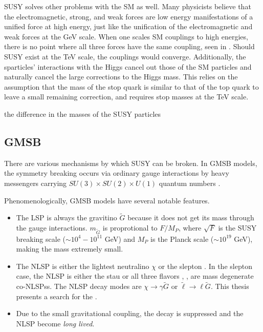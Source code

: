 \ac{SUSY} solves other problems with the \ac{SM} as well. Many physicists believe that the electromagnetic, strong, and weak forces are low energy manifestations of a unified force at high energy, just like the unification of the electromagnetic and weak forces at the GeV scale. When one scales \ac{SM} couplings to high energies, there is no point where all three forces have the same coupling, seen in . Should \ac{SUSY} exist at the TeV scale, the couplings would converge. Additionally, the sparticles' interactions with the Higgs cancel out those of the \ac{SM} particles and naturally cancel the large corrections to the Higgs mass. This relies on the assumption that the mass of the stop quark is similar to that of the top quark to leave a small remaining correction, and requires stop masses at the TeV scale.


the difference in the masses of the \ac{SUSY} particles 





\subsection{GMSB}
\label{sec:gmsb}

There are various mechanisms by which \ac{SUSY} can be broken. In \acf{GMSB} models, the symmetry breaking occurs via ordinary gauge interactions by heavy messengers carrying $SU(3) \times SU(2) \times U(1)$ quantum numbers \cite{gmsb-lep,Dimopoulos_1996,Ambrosanio_1997}. 



Phenomenologically, \ac{GMSB} models have several notable features. 
\begin{itemize}
	\item The \ac{LSP} is always the gravitino $\tilde{G}$ because it does not get its mass through the gauge interactions. $m_{\tilde{G}}$ is proprotional to $F/M_P$, where $\sqrt{F}$ is the \ac{SUSY} breaking scale ($\sim 10^4 - 10^{11}$ GeV) and $M_P$ is the Planck scale ($\sim 10^{19}$ GeV), making the mass extremely small.

	\item The \ac{NLSP} is either the lightest neutralino $\chi$ or the slepton \slep. In the slepton case, the \ac{NLSP} is either the stau \stau or all three flavors \selec, \smu, \stau are mass degenerate co-\acp{NLSP}s. The \ac{NLSP} decay modes are $\chi \rightarrow \gamma \tilde{G}$ or $\tilde{\ell} \rightarrow \ell \tilde{G}$. This thesis presents a search for the  \slep. 

	\item Due to the small gravitational coupling, the decay is suppressed and the \ac{NLSP} become \emph{long lived}. 
\end{itemize}

